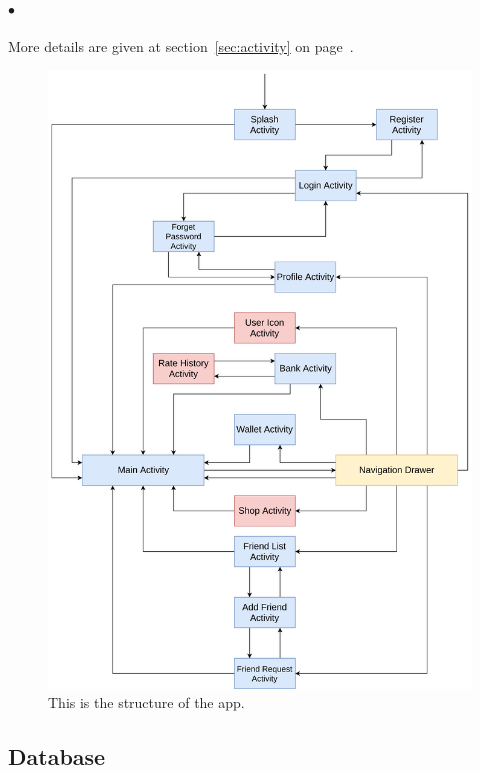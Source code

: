 \documentclass[12pt]{article}
\begin{document}
\paragraph{$\bullet$}
More details are given at section~\ref{sec:activity} on page~\pageref{sec:activity}.
\begin{figure}
	\centering
	\includegraphics[scale=0.085]{Structure.png}
	\caption{\label{fig:structure}This is the structure of the app.}
\end{figure}

\subsection{Database}
\end{document}
